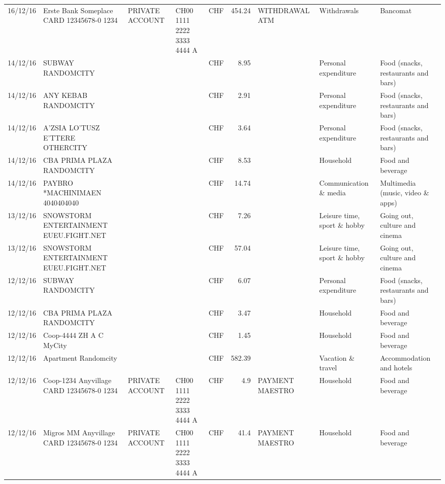\begin{landscape}
\begin{table}[h]
\begin{center}
\begin{tabular}{rllllrlll}
		16/12/16 & Erste Bank Someplace CARD 12345678-0 1234 & PRIVATE ACCOUNT & CH00 1111 2222 3333 4444 A & CHF   & 454.24 & WITHDRAWAL ATM & Withdrawals & Bancomat \\
		14/12/16 & SUBWAY                   RANDOMCITY &       &       & CHF   & 8.95  &       & Personal expenditure & Food (snacks, restaurants and bars) \\
		14/12/16 & ANY KEBAB            RANDOMCITY &       &       & CHF   & 2.91  &       & Personal expenditure & Food (snacks, restaurants and bars) \\
		14/12/16 & A'ZSIA LO'TUSZ E'TTERE   OTHERCITY &       &       & CHF   & 3.64  &       & Personal expenditure & Food (snacks, restaurants and bars) \\
		14/12/16 & CBA PRIMA PLAZA        RANDOMCITY &       &       & CHF   & 8.53  &       & Household & Food and beverage \\
		14/12/16 & PAYBRO *MACHINIMAEN      4040404040 &       &       & CHF   & 14.74 &       & Communication \& media & Multimedia (music, video \& apps) \\
		13/12/16 & SNOWSTORM ENTERTAINMENT EUEU.FIGHT.NET &       &       & CHF   & 7.26  &       & Leisure time, sport \& hobby & Going out, culture and cinema \\
		13/12/16 & SNOWSTORM ENTERTAINMENT EUEU.FIGHT.NET &       &       & CHF   & 57.04 &       & Leisure time, sport \& hobby & Going out, culture and cinema \\
		12/12/16 & SUBWAY                   RANDOMCITY &       &       & CHF   & 6.07  &       & Personal expenditure & Food (snacks, restaurants and bars) \\
		12/12/16 & CBA PRIMA PLAZA        RANDOMCITY &       &       & CHF   & 3.47  &       & Household & Food and beverage \\
		12/12/16 & Coop-4444 ZH A C   MyCity &       &       & CHF   & 1.45  &       & Household & Food and beverage \\
		12/12/16 & Apartment               Randomcity &       &       & CHF   & 582.39 &       & Vacation \& travel & Accommodation and hotels \\
		12/12/16 & Coop-1234 Anyvillage CARD 12345678-0 1234 & PRIVATE ACCOUNT & CH00 1111 2222 3333 4444 A & CHF   & 4.9   & PAYMENT MAESTRO & Household & Food and beverage \\
		12/12/16 & Migros MM Anyvillage CARD 12345678-0 1234 & PRIVATE ACCOUNT & CH00 1111 2222 3333 4444 A & CHF   & 41.4  & PAYMENT MAESTRO & Household & Food and beverage \\

\end{tabular}
\end{center}
\end{table}
\end{landscape}
